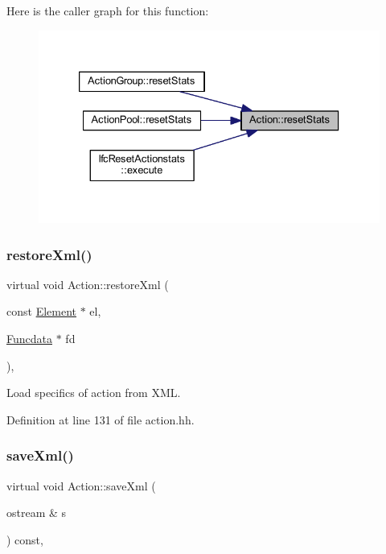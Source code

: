 Here is the caller graph for this function\+:
\nopagebreak
\begin{figure}[H]
\begin{center}
\leavevmode
\includegraphics[width=333pt]{class_action_a8ac616ae7f497202746a92c95e32821d_icgraph}
\end{center}
\end{figure}
\mbox{\label{class_action_a80154d5741583712fc63e64c500ce205}} 
\subsubsection{\texorpdfstring{restoreXml()}{restoreXml()}}
{\footnotesize\ttfamily virtual void Action\+::restore\+Xml (\begin{DoxyParamCaption}\item[{const \mbox{\hyperlink{class_element}{Element}} $\ast$}]{el,  }\item[{\mbox{\hyperlink{class_funcdata}{Funcdata}} $\ast$}]{fd }\end{DoxyParamCaption})\hspace{0.3cm}{\ttfamily [inline]}, {\ttfamily [virtual]}}



Load specifics of action from X\+ML. 



Definition at line 131 of file action.\+hh.

\mbox{\label{class_action_a4a1ebee11b29baa171cbd1dc1d597006}} 
\subsubsection{\texorpdfstring{saveXml()}{saveXml()}}
{\footnotesize\ttfamily virtual void Action\+::save\+Xml (\begin{DoxyParamCaption}\item[{ostream \&}]{s }\end{DoxyParamCaption}) const\hspace{0.3cm}{\ttfamily [inline]}, {\ttfamily [virtual]}}



